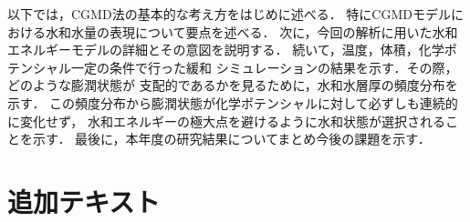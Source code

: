 以下では，CGMD法の基本的な考え方をはじめに述べる．
特にCGMDモデルにおける水和水量の表現について要点を述べる．
次に，今回の解析に用いた水和エネルギーモデルの詳細とその意図を説明する．
続いて，温度，体積，化学ポテンシャル一定の条件で行った緩和
シミュレーションの結果を示す．その際，どのような膨潤状態が
支配的であるかを見るために，水和水層厚の頻度分布を示す．
この頻度分布から膨潤状態が化学ポテンシャルに対して必ずしも連続的に変化せず，
水和エネルギーの極大点を避けるように水和状態が選択されることを示す．
最後に，本年度の研究結果についてまとめ今後の課題を示す．

\section{追加テキスト}

